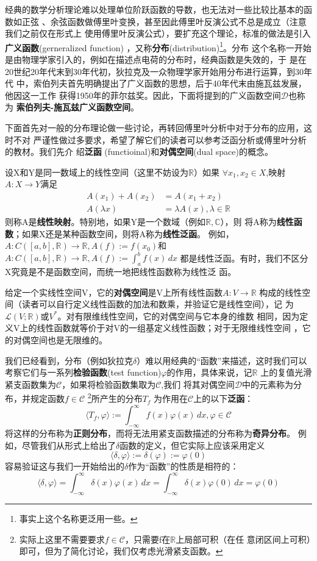 \documentclass{ctexbook}
\begin{document}
经典的数学分析理论难以处理单位阶跃函数的导数，也无法对一些比较比基本的函数如正弦
、余弦函数做傅里叶变换，甚至因此傅里叶反演公式不总是成立（注意我们之前仅在形式上
使用傅里叶反演公式），要扩充这个理论，标准的做法是引入\textbf{广义函数}(gerneralized function)
，又称\textbf{分布}(distribution)\footnote{事实上这个名称更泛用一些。}。分布
这个名称一开始是由物理学家引入的，例如在描述点电荷的分布时，经典函数是失效的，于
是在20世纪20年代末到30年代初，狄拉克及一众物理学家开始用分布进行运算，到30年代
中，索伯列夫首先明确提出了广义函数的思想，后于40年代末由施瓦兹发展，他因这一工作
获得1950年的菲尔兹奖。因此，下面将提到的广义函数空间$\mathcal{D} $也称为
\textbf{索伯列夫-施瓦兹广义函数空间}。

下面首先对一般的分布理论做一些讨论，再转回傅里叶分析中对于分布的应用，这时不对
严谨性做过多要求，希望了解它们的读者可以参考泛函分析或傅里叶分析的教材。我们先介
绍\textbf{泛函} (functioinal)和\textbf{对偶空间}(dual space)的概念。

设X和Y是同一数域上的线性空间（这里不妨设为$\mathbb{R}$）如果
$\forall x_1,x_2\in X$,映射$A:X\to Y$满足
\begin{align*}
    A(x_1)+A(x_2) & =A(x_1+x_2)                        \\
    A(\lambda x)  & =\lambda A(x),\lambda\in\mathbb{R}
\end{align*}
则称A是\textbf{线性映射}。特别地，如果Y是一个数域（例如$\mathbb{R,C}$），则
将A称为\textbf{线性函数}；如果X还是某种函数空间，则将A称为\textbf{线性泛函}。
例如，$A:C([a,b],\mathbb{R})\to\mathbb{R},A(f):=f(x_0)$和$A:C([a,b],\mathbb{R})\to\mathbb{R},A(f):=\int_{a}^{b}f(x)\,dx$
都是线性泛函。有时，我们不区分X究竟是不是函数空间，而统一地把线性函数称为线性泛
函。

给定一个实线性空间V，它的\textbf{对偶空间}是V上所有线性函数$A:V\to\mathbb{R}$
构成的线性空间（读者可以自行定义线性函数的加法和数乘，并验证它是线性空间），记
为$\mathcal{L} (V;\mathbb{R})$或$V^*$。对有限维线性空间，它的对偶空间与它本身的维数
相同，因为定义V上的线性函数就等价于对V的一组基定义线性函数；对于无限维线性空间
，它的对偶空间也是无限维的。

我们已经看到，分布（例如狄拉克$\delta$）难以用经典的“函数”来描述，这时我们可以
考察它们与一系列\textbf{检验函数}(test function)$\varphi$的作用，具体来说，记$\mathbb{R}$
上的复值光滑紧支函数集为$\mathcal{C} $，如果将检验函数集取为$\mathcal{C}$,我们
将其对偶空间$\mathcal{D} $中的元素称为分布，并规定函数$f\in \mathcal{C} $
\footnote{实际上这里不需要要求$f\in\mathcal{C} $，只需要f在$\mathbb{R}$上局部可积（在任
    意闭区间上可积）即可，但为了简化讨论，我们仅考虑光滑紧支函数。}所产生的分布$T_f$
为作用在$\mathcal{C}$上的以下\textbf{泛函}：
\begin{equation}
    \langle T_f,\varphi\rangle:=\int_{-\infty}^{\infty}f(x)\varphi(x)\,dx,\varphi\in\mathcal{C}
\end{equation}
将这样的分布称为\textbf{正则分布}，而将无法用紧支函数描述的分布称为\textbf{奇异分布}。
例如，尽管我们从形式上给出了$\delta$函数的定义，但它实际上应该采用定义
\[\langle \delta,\varphi\rangle:=\delta(\varphi):=\varphi(0)\]
容易验证这与我们一开始给出的$\delta$作为“函数”的性质是相符的：
\[\langle \delta,\varphi\rangle=\int_{-\infty}^{\infty}\delta(x)\varphi(x)\,dx=\int_{-\infty}^{\infty}\delta(x)\varphi(0)\,dx=\varphi(0)\]
\end{document}
